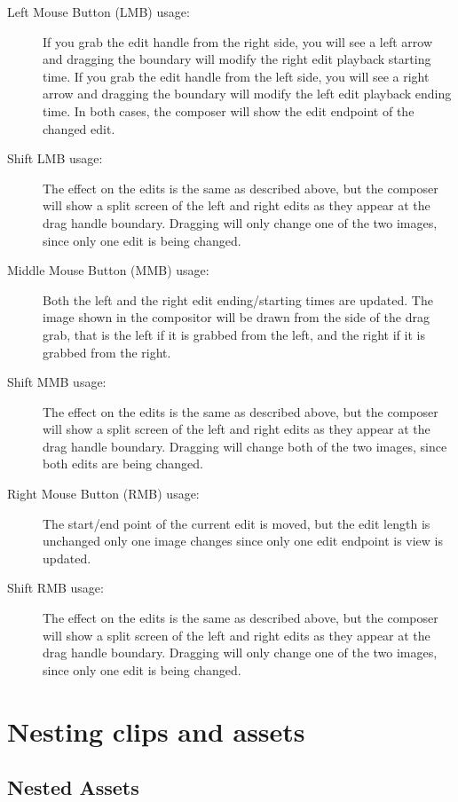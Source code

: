 \begin{description}
	\item[Left Mouse Button (LMB) usage:] If you grab the edit
	handle from the right side, you will see a left arrow and dragging
	the boundary will modify the right edit playback starting time. If
	you grab the edit handle from the left side, you will see a right
	arrow and dragging the boundary will modify the left edit playback
	ending time. In both cases, the composer will show the edit endpoint
	of the changed edit.
	\item[Shift LMB usage:] The effect on the edits is the same as
	described above, but the composer will show a split screen of the
	left and right edits as they appear at the drag handle
	boundary. Dragging will only change one of the two images, since
	only one edit is being changed.
	\item[Middle Mouse Button (MMB) usage:] Both the left and the
	right edit ending/starting times are updated.  The image shown in
	the compositor will be drawn from the side of the drag grab, that is
	the left if it is grabbed from the left, and the right if it is
	grabbed from the right.
	\item[Shift MMB usage:] The effect on the edits is the same as
	described above, but the composer will show a split screen of the
	left and right edits as they appear at the drag handle boundary.
	Dragging will change both of the two images, since both edits are
	being changed.
	\item[Right Mouse Button (RMB) usage:] The start/end point of
	the current edit is moved, but the edit length is unchanged only one
	image changes since only one edit endpoint is view is updated.
	\item[Shift RMB usage:] The effect on the edits is the same as
	described above, but the composer will show a split screen of the
	left and right edits as they appear at the drag handle boundary.
	Dragging will only change one of the two images, since only one edit
	is being changed.
\end{description}




\section{Nesting clips and assets}%
\label{sec:nesting_clips_and_assets}

\subsection{Nested Assets}%
\label{sub:nested_assets}

